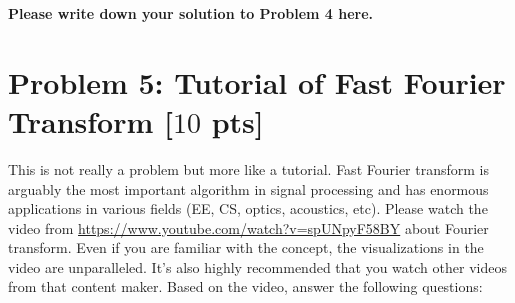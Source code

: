 \documentclass[letterpaper, 11pt]{article}
\newcommand{\1}{\mathds{1}}	%
\theoremstyle{definition}
\newcommand{\problem}[1]{\section*{Problem #1}}
\newenvironment{solution}{{\par\noindent\it Solution.}}{}
\begin{document}
\begin{solution}
\textbf{Please write down your solution to Problem 4 here.}
\end{solution}
\newpage

\problem{5: Tutorial of Fast Fourier Transform [$10$ pts]}
This is not really a problem but more like a tutorial. Fast Fourier transform is arguably the most important algorithm in signal processing and has enormous applications in various fields (EE, CS, optics, acoustics, etc). Please watch the video from \url{https://www.youtube.com/watch?v=spUNpyF58BY} about Fourier transform. Even if you are familiar with the concept, the visualizations in the video are unparalleled. It's also highly recommended that you watch other videos from that content maker. Based on the video, answer the following questions:
\end{document}
